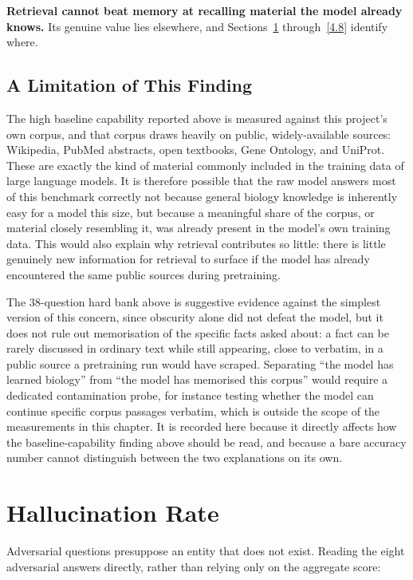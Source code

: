 \textbf{Retrieval cannot beat memory at recalling material the model
already knows.} Its genuine value lies elsewhere, and Sections~\ref{4.4}
through~\ref{4.8} identify where.

\subsection*{A Limitation of This Finding}

The high baseline capability reported above is measured against this
project's own corpus, and that corpus draws heavily on public,
widely-available sources: Wikipedia, PubMed abstracts, open textbooks,
Gene Ontology, and UniProt. These are exactly the kind of material
commonly included in the training data of large language models. It is
therefore possible that the raw model answers most of this benchmark
correctly not because general biology knowledge is inherently easy for a
model this size, but because a meaningful share of the corpus, or material
closely resembling it, was already present in the model's own training
data. This would also explain why retrieval contributes so little: there
is little genuinely new information for retrieval to surface if the model
has already encountered the same public sources during pretraining.

The 38-question hard bank above is suggestive evidence against the
simplest version of this concern, since obscurity alone did not defeat the
model, but it does not rule out memorisation of the specific facts asked
about: a fact can be rarely discussed in ordinary text while still
appearing, close to verbatim, in a public source a pretraining run would
have scraped. Separating ``the model has learned biology'' from ``the
model has memorised this corpus'' would require a dedicated contamination
probe, for instance testing whether the model can continue specific
corpus passages verbatim, which is outside the scope of the measurements
in this chapter. It is recorded here because it directly affects how the
baseline-capability finding above should be read, and because a bare
accuracy number cannot distinguish between the two explanations on its
own.

\section{Hallucination Rate}\label{4.4}

Adversarial questions presuppose an entity that does not exist. Reading
the eight adversarial answers directly, rather than relying only on the
aggregate score:

